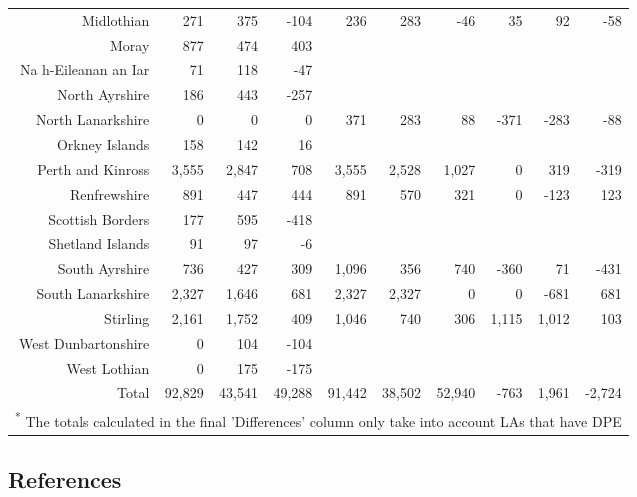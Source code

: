 \documentclass[
  12pt,
]{article}
\begin{document}
\begin{landscape}
\begin{table}[H]
\begin{tabular}[t]{rrrrrrrrrr}
Midlothian & 271 & 375 & -104 & 236 & 283 & -46 & 35 & 92 & -58\\
Moray & 877 & 474 & 403 &  &  &  &  &  & \\
Na h-Eileanan an Iar & 71 & 118 & -47 &  &  &  &  &  & \\
North Ayrshire & 186 & 443 & -257 &  &  &  &  &  & \\
North Lanarkshire & 0 & 0 & 0 & 371 & 283 & 88 & -371 & -283 & -88\\
Orkney Islands & 158 & 142 & 16 &  &  &  &  &  & \\
Perth and Kinross & 3,555 & 2,847 & 708 & 3,555 & 2,528 & 1,027 & 0 & 319 & -319\\
Renfrewshire & 891 & 447 & 444 & 891 & 570 & 321 & 0 & -123 & 123\\
Scottish Borders & 177 & 595 & -418 &  &  &  &  &  & \\
Shetland Islands & 91 & 97 & -6 &  &  &  &  &  & \\
South Ayrshire & 736 & 427 & 309 & 1,096 & 356 & 740 & -360 & 71 & -431\\
South Lanarkshire & 2,327 & 1,646 & 681 & 2,327 & 2,327 & 0 & 0 & -681 & 681\\
Stirling & 2,161 & 1,752 & 409 & 1,046 & 740 & 306 & 1,115 & 1,012 & 103\\
West Dunbartonshire & 0 & 104 & -104 &  &  &  &  &  & \\
West Lothian & 0 & 175 & -175 &  &  &  &  &  & \\
\midrule
Total & 92,829 & 43,541 & 49,288 & 91,442 & 38,502 & 52,940 & -763 & 1,961 & -2,724\\
\bottomrule
\multicolumn{10}{l}{\rule{0pt}{1em}\textsuperscript{*} The totals calculated in the final 'Differences' column only take into account LAs that have DPE}\\
\end{tabular}
\end{table}
\end{landscape}

\hypertarget{references}{%
\subsection*{References}\label{references}}
\end{document}
